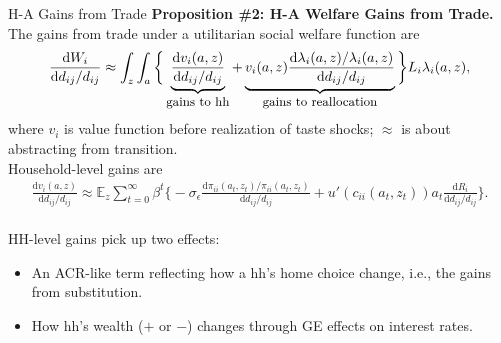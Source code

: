 \documentclass[9pt,pdftex,aspectratio=1610]{beamer}
\theoremstyle{definition}
\begin{document}
\begin{frame}[t]{H-A Gains from Trade}
\smallskip
\textbf{Proposition \#2: H-A Welfare Gains from Trade.} The gains from trade under a utilitarian social welfare function are
\begin{align*}
\frac{\mathrm{d} W_{i}}{\mathrm{d} d_{ij} / d_{ij}} \approx \int_{z} \int_{a}  \bigg \{ \underbrace{\frac{\mathrm{d} v_i(a, z)}{\mathrm{d} d_{ij} / d_{ij}}}_{\small \mbox{gains to hh}}  + \underbrace{v_{i}(a,z) \frac{\mathrm{d} \lambda_{i}(a,z)/ \lambda_{i}(a,z)}{\mathrm{d} d_{ij} / d_{ij}}}_{\small \mbox{gains to reallocation}}   \bigg \} L_i \lambda_{i}(a,z),
\nonumber
\end{align*}
where $v_i$ is value function before realization of taste shocks; $\approx$ is about abstracting from transition. \\
\medskip
Household-level gains are
\begin{align*}
\frac{\mathrm{d} v_i(a, z)}{\mathrm{d} d_{ij} / d_{ij}} \approx \mathbb{E}_{z} \sum_{t = 0}^{\infty} \beta^{t} \bigg \{ -\sigma_{\epsilon} \frac{\mathrm{d} \pi_{ii}(a_{t},z_{t}) / \pi_{ii}(a_{t},z_{t})}{\mathrm{d}d_{ij} / d_{ij}} + u'(c_{ii}(a_{t},z_{t}))a_{t} \frac{\mathrm{d} R_{i}}{\mathrm{d} d_{ij} / d_{ij}} \bigg \}.
\end{align*}\\
\bigskip
\medskip
HH-level gains pick up two effects:
\begin{itemize}
\item An ACR-like term reflecting how a hh's home choice change, i.e., the gains from substitution.
\smallskip
\item How hh's wealth ($+$ or $-$) changes through GE effects on interest rates.
\end{itemize}
\end{frame}

\end{document}

